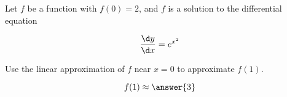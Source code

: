 \documentclass{ximera}
\author{Steven Gubkin}
\begin{document}
\begin{exercise}



Let $f$ be a function with $f(0) = 2$, and $f$ is a solution to the differential equation 

\[

\frac{\d y}{\d x} = e^{x^2}

\]

Use the linear approximation of $f$ near $x=0$ to approximate $f(1)$. 

\begin{prompt}
	\[
	f(1) \approx \answer{3}
	\]
\end{prompt}

\end{exercise}
\end{document}
